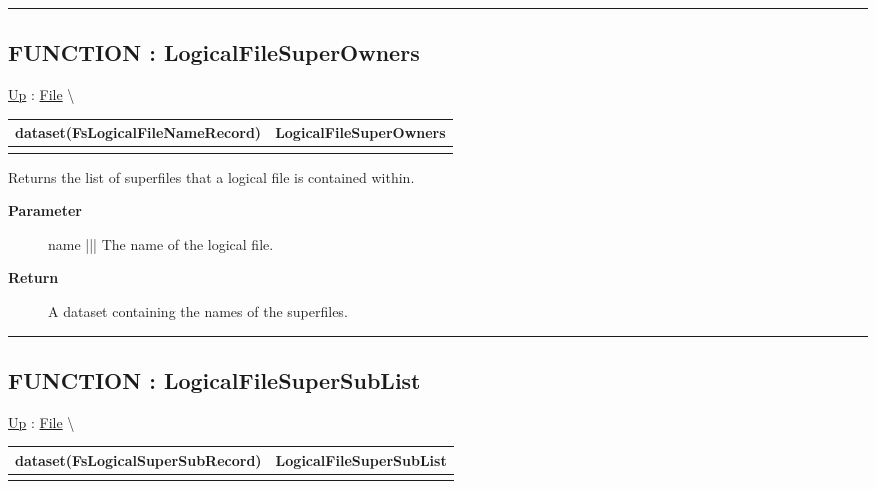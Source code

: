 \rule{\linewidth}{0.5pt}
\subsection*{FUNCTION : LogicalFileSuperOwners}
\hypertarget{ecldoc:file.logicalfilesuperowners}{}
\hyperlink{ecldoc:File}{Up} :
\hspace{0pt} \hyperlink{ecldoc:File}{File} \textbackslash 

{\renewcommand{\arraystretch}{1.5}
\begin{tabularx}{\textwidth}{|>{\raggedright\arraybackslash}l|X|}
\hline
\hspace{0pt}dataset(FsLogicalFileNameRecord) & LogicalFileSuperOwners \\
\hline
\multicolumn{2}{|>{\raggedright\arraybackslash}X|}{\hspace{0pt}(varstring name)} \\
\hline
\end{tabularx}
}

\par
Returns the list of superfiles that a logical file is contained within.

\par
\begin{description}
\item [\textbf{Parameter}] name ||| The name of the logical file.
\item [\textbf{Return}] A dataset containing the names of the superfiles.
\end{description}

\rule{\linewidth}{0.5pt}
\subsection*{FUNCTION : LogicalFileSuperSubList}
\hypertarget{ecldoc:file.logicalfilesupersublist}{}
\hyperlink{ecldoc:File}{Up} :
\hspace{0pt} \hyperlink{ecldoc:File}{File} \textbackslash 

{\renewcommand{\arraystretch}{1.5}
\begin{tabularx}{\textwidth}{|>{\raggedright\arraybackslash}l|X|}
\hline
\hspace{0pt}dataset(FsLogicalSuperSubRecord) & LogicalFileSuperSubList \\
\hline
\multicolumn{2}{|>{\raggedright\arraybackslash}X|}{\hspace{0pt}()} \\
\hline
\end{tabularx}
}

